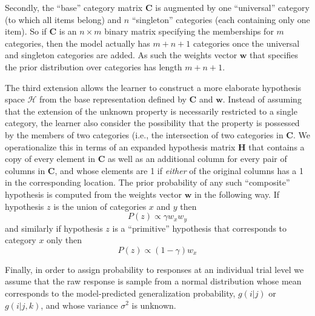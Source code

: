 Secondly, the ``base'' category matrix $\mathbf{C}$ is augmented by one ``universal'' category (to which all items belong) and $n$ ``singleton'' categories (each containing only one item). So if $\mathbf{C}$ is an $n \times m$ binary matrix specifying the memberships for $m$ categories, then the model actually has $m+n+1$ categories once the universal and singleton categories are added. As such the weights vector $\mathbf{w}$ that specifies the prior distribution over categories has length $m+n+1$.

The third extension allows the learner to construct a more elaborate hypothesis space $\mathcal{H}$ from the base representation defined by $\mathbf{C}$ and $\mathbf{w}$. Instead of assuming that the extension of the unknown property is necessarily restricted to a single category, the learner also consider the possibility that the property is possessed by the members of two categories (i.e., the intersection of two categories in $\mathbf{C}$. We operationalize this in terms of an expanded hypothesis matrix $\mathbf{H}$ that contains a copy of every element in $\mathbf{C}$ as well as an additional column for every pair of columns in $\mathbf{C}$, and whose elements are 1 if {\it either} of the original columns has a 1 in the corresponding location. The prior probability of any such ``composite'' hypothesis is computed from the weights vector $\mathbf{w}$ in the following way. If hypothesis $z$ is the union of categories $x$ and $y$ then
\begin{equation}
P(z) \propto \gamma w_x w_y
\end{equation}
and similarly if hypothesis $z$ is a ``primitive'' hypothesis that corresponds to category $x$ only then 
\begin{equation}
P(z) \propto (1-\gamma) w_x
\end{equation}
 
Finally, in order to assign probability to responses at an individual trial level we assume that the raw response is sample from a normal distribution whose mean corresponds to the model-predicted generalization probability, $g(i|j)$ or $g(i|j,k)$, and whose variance $\sigma^2$ is unknown.   
 
